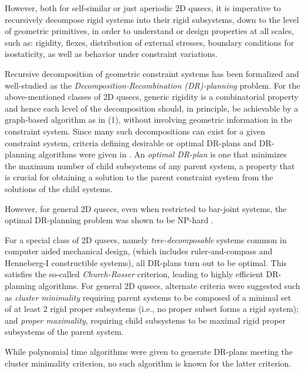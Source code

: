 However, both for self-similar or just aperiodic 2D qusecs, it is
imperative to recursively decompose rigid systems
into their rigid subsystems, down to the level of
geometric primitives, in order to
understand or design properties at all scales, such as:
rigidity, flexes, distribution
of external stresses, boundary conditions for isostaticity,
as well as behavior under constraint variations.

\medskip\noindent{}
Recursive decomposition of geometric constraint systems has been
formalized \cite{XX} and well-studied \cite{XX}
as the {\sl Decomposition-Recombination (DR)-planning} problem.
For the above-mentioned classes of 2D qusecs, generic rigidity is
a combinatorial property and hence each level of the decomposition should,
in principle, be achievable by a graph-based algorithm as in (1), without
involving geometric information in the constraint system.
Since many  such decompositions can exist for a given constraint system,
criteria defining desirable or optimal DR-plans and DR-planning algorithms
were given in \cite{XX}. An {\em optimal DR-plan} is one
that minimizes the maximum number of child subsystems of any parent
system, a property that is
crucial for obtaining a solution to the parent constraint system from the
solutions of the child systems.

However, for general 2D qusecs, even when restricted to bar-joint systems,
the optimal DR-planning problem was shown to be NP-hard \cite{XX}.

\medskip\noindent{}
For a special class of 2D qusecs, namely  {\em tree-decomposable} systems
\cite{XX} common in computer aided mechanical design,
(which includes ruler-and-compass and Henneberg-I constructible systems),
all DR-plans turn out to
be optimal. This satisfies the so-called {\em Church-Rosser} criterion,
leading to highly efficient DR-planning algorithms.
For general 2D qusecs, alternate criteria were suggested
such as {\em cluster minimality}
requiring parent systems to be composed of
a minimal set of at least 2 rigid proper subsystems (i.e., no proper
subset forms a rigid system);
and {\em proper maximality}, requiring child subsystems
to be maximal rigid proper subsystems of the parent system.

While polynomial time algorithms were given \cite{XX} to generate DR-plans
meeting the cluster minimality criterion,
no such algorithm is known for the latter criterion.


